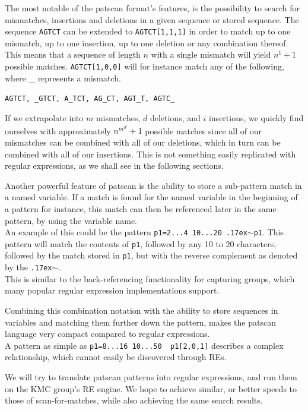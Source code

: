 \documentclass[12pt]{article}
\theoremstyle{definition}
\begin{document}
The most notable of the patscan format's features, is the possibility to search for mismatches, insertions and deletions in a given sequence or stored sequence. The sequence \texttt{AGTCT} can be extended to \texttt{AGTCT[1,1,1]} in order to match up to one mismatch, up to one insertion, up to one deletion or any combination thereof. \\
This means that a sequence of length $n$ with a single mismatch will yield $n^1+1$ possible matches. \texttt{AGTCT[1,0,0]} will for instance match any of the following, where \_ represents a mismatch.

\texttt{AGTCT, \_GTCT, A\_TCT, AG\_CT, AGT\_T, AGTC\_}

If we extrapolate into $m$ mismatches, $d$ deletions, and $i$ insertions, we quickly find ourselves with approximately $n^{m^{d^{i}}}+1$ possible matches since all of our mismatches can be combined with all of our deletions, which in turn can be combined with all of our insertions. This is not something easily replicated with regular expressions, as we shall see in the following sections.

Another powerful feature of patscan is the ability to store a sub-pattern match in a named variable. If a match is found for the named variable in the beginning of a pattern for instance, this match can then be referenced later in the same pattern, by using the variable name. \\
An example of this could be the pattern \texttt{p1=2...4 10...20 {\raise.17ex\hbox{$\scriptstyle\mathtt{\sim}$}}p1}. This pattern will match the contents of \texttt{p1}, followed by any 10 to 20 characters, followed by the match stored in \texttt{p1}, but with the reverse complement as denoted by the \texttt{{\raise.17ex\hbox{$\scriptstyle\mathtt{\sim}$}}}.\\
This is similar to the back-referencing functionality for capturing groups, which many popular regular expression implementations support.%

Combining this combination notation with the ability to store sequences in variables and matching them further down the pattern, makes the patscan language very compact compared to regular expressions. \\
A pattern as simple as \texttt{p1=8...16 10...50 ~p1[2,0,1]} describes a complex relationship, which cannot easily be discovered through REs.

We will try to translate patscan patterns into regular expressions, and run them on the KMC group's RE engine. We hope to achieve similar, or better speeds to those of scan-for-matches, while also achieving the same search results.
\end{document}
